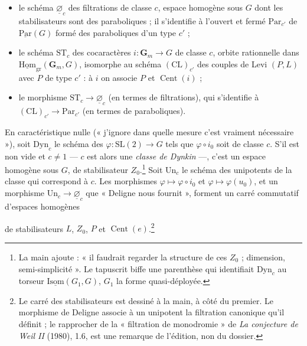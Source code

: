 \documentclass[11pt,a4paper]{article}
\begin{document}
\begin{itemize}
\item le schéma $\underline{\varnothing}_{c}$ des filtrations de classe $c$,
  espace homogène sous $G$ dont les stabilisateurs sont des paraboliques ; il
  s'identifie à l'ouvert et fermé $\mathrm{Par}_{c'}$ de
  $\underline{\mathrm{Par}}(G)$ formé des paraboliques d'un type $c'$ ;
\item le schéma $\mathrm{ST}_{c}$ des cocaractères
  $i\colon\mathbf{G}_{m}\to G$ de classe $c$, orbite rationnelle dans
  $\underline{\mathrm{Hom}}_{\mathrm{gr}}(\mathbf{G}_{m},G)$, isomorphe au
  schéma $(\mathrm{CL})_{c'}$ des couples de Levi $(P,L)$ avec $P$ de type
  $c'$ : à $i$ on associe $P$ et $\operatorname{Cent}(i)$ ;
\item le morphisme $\mathrm{ST}_{c}\to\underline{\varnothing}_{c}$ (en termes de
  filtrations), qui s'identifie à $(\mathrm{CL})_{c'}\to\mathrm{Par}_{c'}$ (en
  termes de paraboliques).
\end{itemize}

En caractéristique nulle (« j'ignore dans quelle mesure c'est vraiment
nécessaire »), soit $\mathrm{Dyn}_{c}$ le schéma des
$\varphi\colon\mathrm{SL}(2)\to G$ tels que $\varphi\circ i_{0}$ soit de classe
$c$. S'il est non vide et $c\neq 1$ — $c$ est alors une \emph{classe de
Dynkin} —, c'est un espace homogène sous $G$, de stabilisateur
$Z_{0}$.\footnote{La main ajoute : « il faudrait regarder la structure de ces
$Z_{0}$ ; dimension, semi-simplicité ». Le tapuscrit biffe une parenthèse qui
identifiait $\mathrm{Dyn}_{c}$ au torseur $\underline{\mathrm{Isom}}(G_{1},G)$,
$G_{1}$ la forme quasi-déployée.} Soit $\mathrm{Un}_{c}$ le schéma des
unipotents de la classe qui correspond à $c$. Les morphismes $\varphi\mapsto
\varphi\circ i_{0}$ et $\varphi\mapsto\varphi(u_{0})$, et un morphisme
$\mathrm{Un}_{c}\to\underline{\varnothing}_{c}$ que « Deligne nous fournit »,
forment un carré commutatif d'espaces homogènes


de stabilisateurs $L$, $Z_{0}$, $P$ et $\operatorname{Cent}(e)$.\footnote{Le
carré des stabilisateurs est dessiné à la main, à côté du premier. Le morphisme
de Deligne associe à un unipotent la filtration canonique qu'il définit ; le
rapprocher de la « filtration de monodromie » de \emph{La conjecture de Weil
II} (1980), 1.6, est une remarque de l'édition, non du dossier.}
\end{document}
